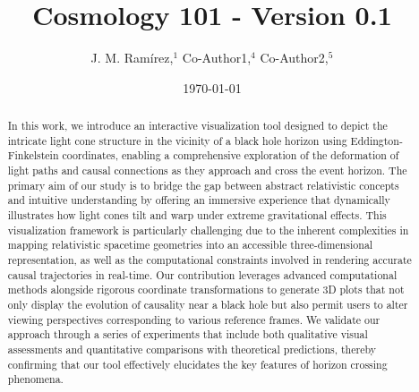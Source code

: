 \documentclass{article}
\title{Cosmology 101 - Version 0.1}
\author{J. M. Ram{\'i}rez,$^{1}$ Co-Author1,$^{4}$ Co-Author2,$^{5}$}
\date{\today}
\begin{document}
\maketitle

 \begin{abstract}

 In this work, we introduce an interactive visualization tool designed to depict the intricate light cone structure in the vicinity of a black hole horizon using Eddington-Finkelstein coordinates, enabling a comprehensive exploration of the deformation of light paths and causal connections as they approach and cross the event horizon. The primary aim of our study is to bridge the gap between abstract relativistic concepts and intuitive understanding by offering an immersive experience that dynamically illustrates how light cones tilt and warp under extreme gravitational effects. This visualization framework is particularly challenging due to the inherent complexities in mapping relativistic spacetime geometries into an accessible three-dimensional representation, as well as the computational constraints involved in rendering accurate causal trajectories in real-time. Our contribution leverages advanced computational methods alongside rigorous coordinate transformations to generate 3D plots that not only display the evolution of causality near a black hole but also permit users to alter viewing perspectives corresponding to various reference frames. We validate our approach through a series of experiments that include both qualitative visual assessments and quantitative comparisons with theoretical predictions, thereby confirming that our tool effectively elucidates the key features of horizon crossing phenomena. 

 \end{abstract} 
\end{document}

